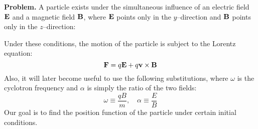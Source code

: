 \documentclass{article}
\begin{document}
\insertTitle

\textbf{Problem.} A particle exists under the simultaneous influence of an electric field $\vb{E}$ and a magnetic field $\vb{B}$, where $\vb{E}$ points only in the $y$--direction and $\vb{B}$ points only in the $z$--direction:
\begin{center}
\end{center}
Under these conditions, the motion of the particle is subject to the Lorentz equation:
\[
    \vb{F} = q\vb{E} + q\vb{v}\times\vb{B}
\]
Also, it will later become useful to use the following substitutions, where $\omega$ is the cyclotron frequency and $\alpha$ is simply the ratio of the two fields:
\[
    \omega \equiv \frac{qB}{m}, \quad \alpha \equiv \frac{E}{B}
\]
Our goal is to find the position function of the particle under certain initial conditions.
\end{document}
